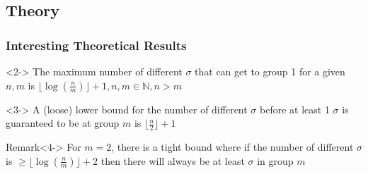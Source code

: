 \documentclass{beamer}
\begin{document}
\subsection{Theory}
\begin{frame}
  \frametitle{Interesting Theoretical Results}
  \begin{theorem}<2->
    The maximum number of different $\sigma$ that can get to group 1 for a given $n, m$ is $\lfloor \log \left ( \frac{n}{m} \right ) \rfloor + 1, n,m \in \mathbb{N}, n > m$
  \end{theorem}
  \begin{theorem}<3->
    A (loose) lower bound for the number of different $\sigma$ before at least 1 $\sigma$ is guaranteed to be at group $m$ is $\lfloor \frac{n}{2} \rfloor + 1$
  \end{theorem}
  
  \begin{block}{Remark}<4->
    For $m = 2$, there is a tight bound where if the number of different $\sigma$ is $\geq \lfloor \log \left ( \frac{n}{m} \right ) \rfloor + 2$ then there will always be at least $\sigma$ in group $m$
  \end{block}
\end{frame}
\end{document}
